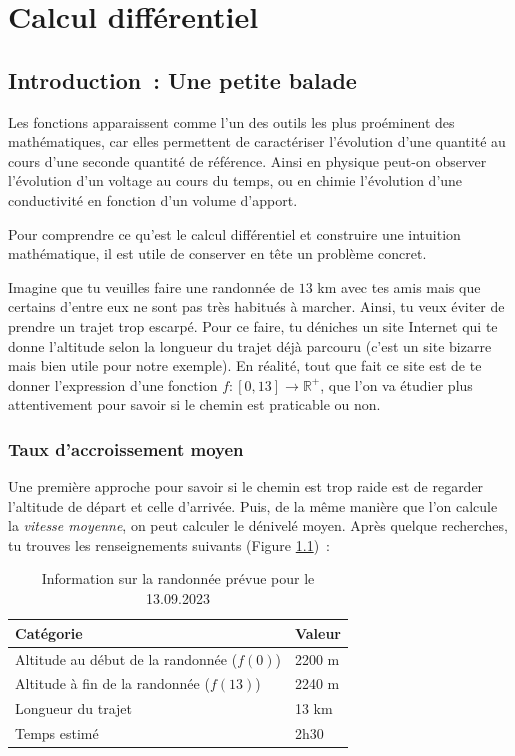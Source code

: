 \chapter{Calcul différentiel}

\section{Introduction~: Une petite balade\textellipsis}
Les fonctions apparaissent comme l'un des outils les plus proéminent des mathématiques, car elles permettent de caractériser l'évolution d'une quantité au cours d'une seconde quantité de référence. Ainsi en physique peut-on observer l'évolution d'un voltage au cours du temps, ou en chimie l'évolution d'une conductivité en fonction d'un volume d'apport. 

Pour comprendre ce qu'est le calcul différentiel et construire une intuition mathématique, il est utile de conserver en tête un problème concret.

Imagine que tu veuilles faire une randonnée de $13$ km avec tes amis mais que certains d'entre eux ne sont pas très habitués à marcher. Ainsi, tu veux éviter de prendre un trajet trop escarpé. Pour ce faire, tu déniches un site Internet qui te donne l'altitude selon la longueur du trajet déjà parcouru (c'est un site bizarre mais bien utile pour notre exemple). En réalité, tout que fait ce site est de te donner l'expression d'une fonction $f : [0, 13] \to \mathbb{R}^{+}$, que l'on va étudier plus attentivement pour savoir si le chemin est praticable ou non.

\subsection{Taux d'accroissement moyen}
Une première approche pour savoir si le chemin est trop raide est de regarder l'altitude de départ et celle d'arrivée. Puis, de la même manière que l'on calcule la \emph{vitesse moyenne}, on peut calculer le dénivelé moyen. Après quelque recherches, tu trouves les renseignements suivants (Figure \ref{fig:differential_calculus_ex_table_1})~:

\begin{table}[H]
\centering
{}
\begin{tabular}{|p{10cm}|p{4cm}|}
    \hline
    Catégorie & Valeur \\
    \hline

    Altitude au début de la randonnée ($f(0)$) & 2200 m \\
    Altitude à fin de la randonnée ($f(13)$) & 2240 m \\
    Longueur du trajet & 13 km \\
    Temps estimé & 2h30 \\
    
    \hline
\end{tabular}
\caption{Information sur la randonnée prévue pour le 13.09.2023}
\label{fig:differential_calculus_ex_table_1}
\end{table}


